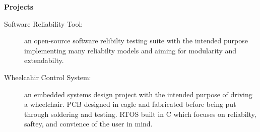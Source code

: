 \documentclass[letterpaper,11pt]{article}
\newcommand{\resheading}[1]{{\large \colorbox{mygrey}{\begin{minipage}{\textwidth}{\textbf{#1 \vphantom{p\^{E}}}}\end{minipage}}}}
\begin{document}
\begin{description}
	\end{description} %

\resheading{{Projects}}

\begin{description}
\item[Software Reliability Tool:] { \footnotesize an open-source software relibilty testing suite with the intended purpose implementing many reliabilty models and aiming for modularity and extendabilty.  }

\item[Wheelcahir Control System:] { \footnotesize an embedded systems design project with the intended purpose of driving a wheelchair. PCB designed in eagle and fabricated before being put through soldering and testing. RTOS built in C which focuses on reliabilty, saftey, and convience of the user in mind.}

\end{description}
\end{document}
